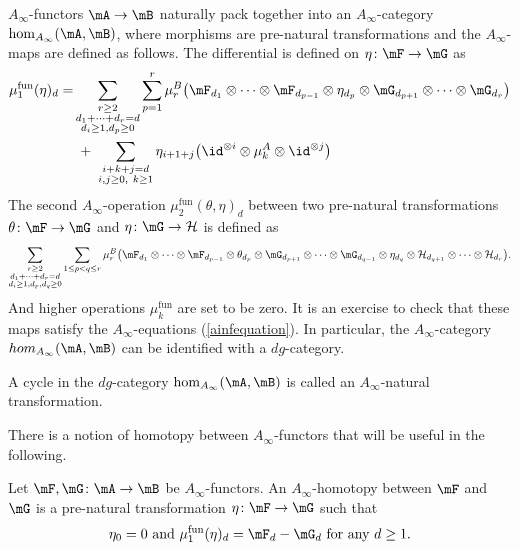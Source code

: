 $A_\infty$-functors $\mA\to \mB$ naturally pack together into an $A_\infty$-category $\hom_{A_\infty}(\mA,\mB)$, where morphisms are pre-natural transformations and the $A_\infty$-maps are defined as follows.
The differential is defined on $\eta\colon \mF\to\mG$ as 
\begin{align*}
\mu_1^{\mathrm{fun}}(\eta)_d
=&
\sum_{\substack{r\ge 2\\ d_1+\cdots+d_r=d\\ d_i\geq 1, d_p\geq 0}}
\sum_{p=1}^r
\mu_r^B\bigl(
\mF_{d_1}\otimes \cdots \otimes \mF_{d_{p-1}}
\otimes \eta_{d_p}
\otimes \mG_{d_{p+1}}\otimes \cdots \otimes \mG_{d_r}
\bigr)\\ &
\;+\;
\sum_{\substack{i+k+j=d\\ i,j\ge 0,\ k\ge 1}}
\eta_{i+1+j}\bigl(
\id^{\otimes i}\otimes \mu_k^A\otimes \id^{\otimes j}
\bigr)
\end{align*}
The second $A_\infty$-operation $\mu_2^{\mathrm{fun}}(\theta,\eta)_d$ between two pre-natural transformations $\theta\colon \mF\to \mG$ and $\eta\colon \mG\to \mathcal{H}$ is defined as
\[
\sum_{\substack{r\ge 2\\ d_1+\cdots+d_r=d\\d_i\geq 1, d_p,d_q\geq 0}}
\sum_{1\le p<q\le r}
\mu_r^B\bigl(
\mF_{d_1}\otimes \cdots \otimes \mF_{d_{p-1}}
\otimes \theta_{d_p}
\otimes \mG_{d_{p+1}}\otimes \cdots \otimes \mG_{d_{q-1}}
\otimes \eta_{d_q}
\otimes \mathcal{H}_{d_{q+1}}\otimes \cdots \otimes \mathcal{H}_{d_r}
\bigr).
\]
And higher operations $\mu_k^{\text{fun}}$ are set to be zero. It is an exercise to check that these maps satisfy the $A_\infty$-equations (\ref{ainfequation}). In particular, the $A_\infty$-category $hom_{A_\infty}(\mA,\mB)$ can be identified with a $dg$-category.
\begin{dfn}
  A cycle in the $dg$-category $\hom_{A_\infty}(\mA,\mB)$ is called an $A_\infty$-natural transformation.
\end{dfn}
There is a notion of homotopy between $A_\infty$-functors that will be useful in the following.
\begin{dfn}
  Let $\mF, \mG\colon \mA\to \mB$ be $A_\infty$-functors. An $A_\infty$-homotopy between $\mF$ and $\mG$ is a pre-natural transformation $\eta\colon \mF\to\mG$ such that $$\eta_0=0 \text{    and    }\mu_1^{\text{fun}}(\eta)_d= \mF_d-\mG_d \text{ for any }d\geq 1.$$
\end{dfn}


